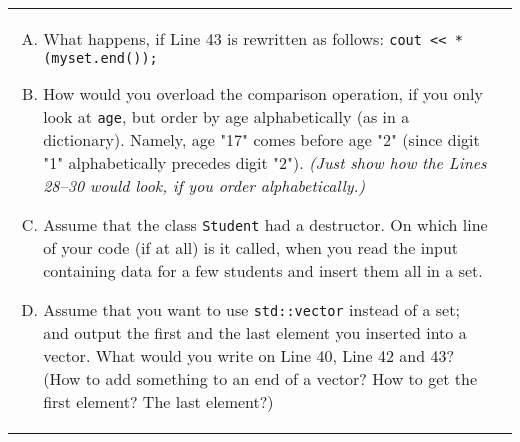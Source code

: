 \documentclass[11pt]{article}
\begin{document}
\begin{tabular}[t]{@{}ll@{}}
\begin{minipage}[t]{0.5\columnwidth}
\begin{enumerate}[(A)]
\item What happens, if Line 43 
is rewritten as follows:
{\tt cout << *(myset.end());}
\vspace{30pt}
\item How would you overload the comparison operation, 
if you only look at {\tt age}, but order by age alphabetically (as in a dictionary). 
Namely, age "17" comes before age "2" (since digit "1" alphabetically 
precedes digit "2"). 
{\em (Just show how the Lines 28--30 would look, if you order alphabetically.)}
\vspace{30pt}
\item Assume that the class {\tt Student} had a destructor.
On which line of your code (if at all) is it called, when you read the input containing data 
for a few students and insert them all in a set.
\vspace{30pt}
\item Assume that you want to use {\tt std::vector} instead of 
a set; and output the first and the last element you inserted into a vector. 
What would you write on Line 40, Line 42 and 43? (How to add something to an end of a vector? 
How to get the first element? The last element?)
\end{enumerate}


\end{minipage}
\end{tabular}
\end{document}
